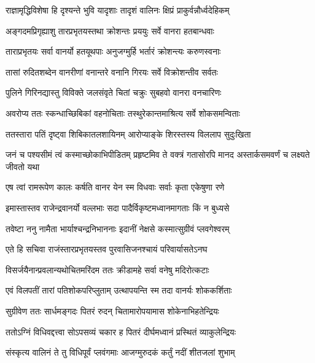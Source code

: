 \twolineshloka
{राज्ञामृद्धिविशेषा हि दृश्यन्ते भुवि यादृशाः}
{तादृशं वालिनः क्षिप्रं प्राकुर्वन्नौर्ध्वदेहिकम्} %

\twolineshloka
{अङ्गदमप्रिगृह्याशु तारप्रभृतयस्तथा}
{क्रोशन्तः प्रययुः सर्वे वानरा हतबान्धवाः} %

\twolineshloka
{ताराप्रभृतयः सर्वा वानर्यो हतयूथपाः}
{अनुजग्मुर्हि भर्तारं क्रोशन्त्यः करुणस्वनाः} %

\twolineshloka
{तासां रुदितशब्देन वानरीणां वनान्तरे}
{वनानि गिरयः सर्वे विक्रोशन्तीव सर्वतः} %

\twolineshloka
{पुलिने गिरिनद्यास्तु विविक्ते जलसंवृते}
{चितां चक्रुः सुबहवो वानरा वनचारिणः} %

\twolineshloka
{अवरोप्य ततः स्कन्धाच्छिबिकां वहनोचिताः}
{तस्थुरेकान्तमाश्रित्य सर्वे शोकसमन्विताः} %

\twolineshloka
{ततस्तारा पतिं दृष्ट्वा शिबिकातलशायिनम्}
{आरोप्याङ्के शिरस्तस्य विललाप सुदुःखिता} %

\threelineshloka
{जनं च पश्यसीमं त्वं कस्माच्छोकाभिपीडितम्}
{प्रहृष्टमिव ते वक्त्रं गतासोरपि मानद}
{अस्तार्कसमवर्णं च लक्ष्यते जीवतो यथा} %

\twolineshloka
{एष त्वां रामरूपेण कालः कर्षति वानर}
{येन स्म विधवाः सर्वाः कृता एकेषुणा रणे} %

\twolineshloka
{इमास्तास्तव राजेन्द्रवानर्यो वल्लभाः सदा}
{पादैर्विकृष्टमध्वानमागताः किं न बुध्यसे} %

\twolineshloka
{तवेष्टा ननु नामैता भार्याश्चन्द्रनिभाननाः}
{इदानीं नेक्षसे कस्मात्सुग्रीवं प्लवगेश्वरम्} %

\twolineshloka
{एते हि सचिवा राजंस्तारप्रभृतयस्तव}
{पुरवासिजनश्चायं परिवार्यासतेऽनघ} %

\twolineshloka
{विसर्जयैनान्प्रवलान्यथोचितमरिंदम}
{ततः क्रीडामहे सर्वा वनेषु मदिरोत्कटाः} %

\twolineshloka
{एवं विलपतीं तारां पतिशोकपरिप्लुताम्}
{उत्थापयन्ति स्म तदा वानर्यः शोककर्शिताः} %

\twolineshloka
{सुग्रीवेण ततः सार्धमङ्गदः पितरं रुदन्}
{चितामारोपयामास शोकेनाभिहतेन्द्रियः} %

\twolineshloka
{ततोऽग्निं विधिवद्दत्त्वा सोऽपसव्यं चकार ह}
{पितरं दीर्घमध्वानं प्रस्थितं व्याकुलेन्द्रियः} %

\twolineshloka
{संस्कृत्य वालिनं ते तु विधिपूर्वं प्लवंगमाः}
{आजग्मुरुदकं कर्तुं नदीं शीतजलां शुभाम्} %


